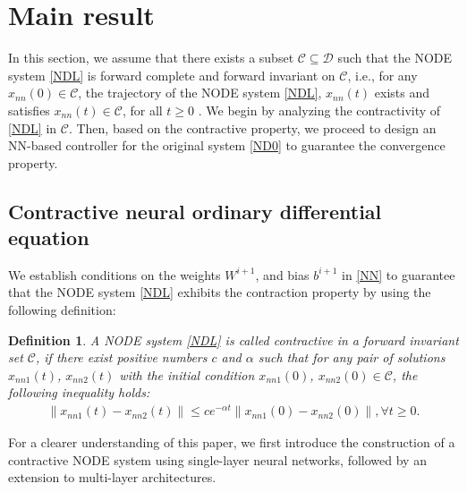 \documentclass[journal,twoside,web]{ieeecolor}
\newtheorem{definition}         [theorem]{Definition}
\begin{document}
\section{Main result}\label{secmr}
In this section, we assume that there exists a subset $\mathcal{C}\subseteq \mathcal{D}$ such that the NODE system \eqref{NDL} is forward complete and forward invariant on $\mathcal{C}$, i.e., for any $x_{nn}(0)\in \mathcal{C}$, the trajectory of the NODE system \eqref{NDL}, $x_{nn}(t)$ exists and satisfies $x_{nn}(t)\in\mathcal{C}$, for all $t\geq 0$ \cite{strasser2024koopman}. We begin by analyzing the contractivity of \eqref{NDL} in $\mathcal{C}$. Then, based on the contractive property, we proceed to design an NN-based controller for the original system \eqref{ND0} to guarantee the convergence property.

\subsection{Contractive neural ordinary differential equation}\label{CNODE}
We establish conditions on the weights $W^{i+1}$, and bias $b^{i+1}$ in \eqref{NN} to guarantee that the NODE system \eqref{NDL} exhibits the contraction property by using the following definition: 
\begin{definition}\label{d1}
A NODE system \eqref{NDL} is called {\em contractive} in a forward invariant set $\mathcal{C}$, if there exist positive numbers $c$ and $\alpha$ such that for any pair of solutions $x_{nn1}(t)$, $x_{nn2}(t)$ with the initial condition $x_{nn1}(0)$, $x_{nn2}(0)\in \mathcal{C}$, the following inequality holds:
\begin{equation} \label{eq:d1}
\begin{aligned}
\|
x_{nn1}(t)-x_{nn2}(t)
\|\leq ce^{-\alpha t}\|
x_{nn1}(0)-x_{nn2}(0)
\|, \forall t\geq 0.
\end{aligned}
\end{equation}
\end{definition}

For a clearer understanding of this paper, we first introduce the construction of a contractive NODE system using single-layer neural networks, followed by an extension to multi-layer architectures.
\end{document}
